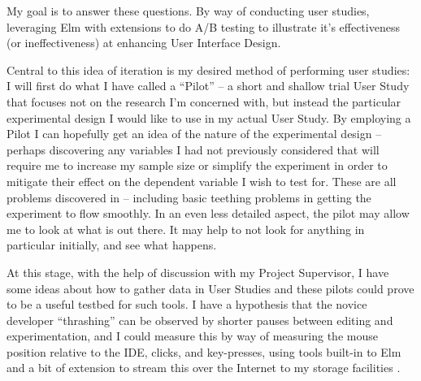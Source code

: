 \documentclass[11pt,openright,a4paper]{report}
\begin{document}
My goal is to answer these questions. By way of conducting user studies, 
leveraging Elm with extensions to do A/B testing to illustrate it's
effectiveness (or ineffectiveness) at enhancing User Interface Design. 

Central to this idea of iteration
is my desired method of performing user studies: I will first do what I have called a
``Pilot'' -- a short and shallow trial User Study that focuses not on the
research I'm concerned with, but instead the particular experimental design I
would like to use in my actual User Study. By employing a Pilot I can hopefully
get an idea of the nature of the experimental design -- perhaps discovering any
variables I had not previously considered that will require me to increase my
sample size or simplify the experiment in order to mitigate their effect on the
dependent variable I wish to test for. These are all problems discovered in
\cite{Yates2012a} -- including basic teething problems in
getting the experiment to flow smoothly. In an even less detailed aspect, the
pilot may allow me to look at what is out there. It may help to not look
for anything in particular initially, and see what happens. 

At this stage, with
the help of discussion with my Project Supervisor, I have some ideas about how
to gather data in User Studies and these pilots could prove to be a useful
testbed for such tools. I have a hypothesis that the novice developer
``thrashing'' \cite{Lopez2012a} can be observed by shorter pauses between editing and
experimentation, and I could measure this by way of measuring the mouse position
relative to the IDE, clicks, and key-presses, using tools built-in to Elm and a
bit of extension to stream this over the Internet to my storage facilities
\cite{WhatFRP}.



\end{document}
